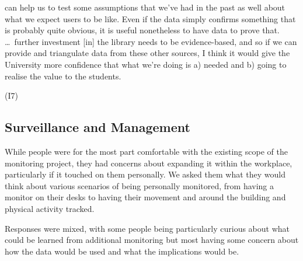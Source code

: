 \begin{qt} can help us to test some
  assumptions that we’ve had in the past as well about what we expect
  users to be like. Even if the data simply confirms something that is
  probably quite obvious, it is useful nonetheless to have data to
  prove that. \ldots\ further investment [in] the library needs to be
  evidence-based, and so if we can provide and triangulate data from
  these other sources, I think it would give the University more
  confidence that what we’re doing is a) needed and b) going to
  realise the value to the students.\end{qt} (I7)



\subsection{Surveillance and Management}
\label{sec:people-dont-want}

While people were for the most part comfortable with the existing
scope of the monitoring project, they had concerns about expanding it
within the workplace, particularly if it touched on them
personally. We asked them what they would think about various
scenarios of being personally monitored, from having a monitor on
their desks to having their movement and around the building and
physical activity tracked.

Responses were mixed, with some people being particularly curious
about what could be learned from additional monitoring but most having
some concern about how the data would be used and what the
implications would be.

